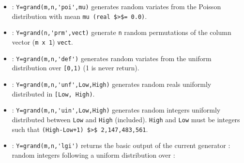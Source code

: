 \begin{itemize}
\item {} : \verb!Y=grand(m,n,'poi',mu)! generates random variates from the Poisson 
  distribution with mean \verb!mu (real $>$= 0.0)!.
\item {} : \verb!Y=grand(n,'prm',vect)! generate \verb!n! random permutations of the
  column vector (\verb!m x 1!) \verb!vect!.
\item {} : \verb!Y=grand(m,n,'def')! generates random variates from the uniform 
  distribution over \verb![0,1)! (1 is never return).
  \item {} : \verb!Y=grand(m,n,'unf',Low,High)! generates random reals uniformly distributed 
    in \verb![Low, High)!.
    \item {} : \verb!Y=grand(m,n,'uin',Low,High)! generates random integers uniformly 
      distributed between \verb!Low! and \verb!High! (included). \verb!High!
      and \verb!Low! must be integers such that \verb!(High-Low+1) $>$ 2,147,483,561!.
    \item {} : \verb!Y=grand(m,n,'lgi')! returns the basic output of the current generator : random integers  
      following a uniform distribution over : 
\end{itemize}


